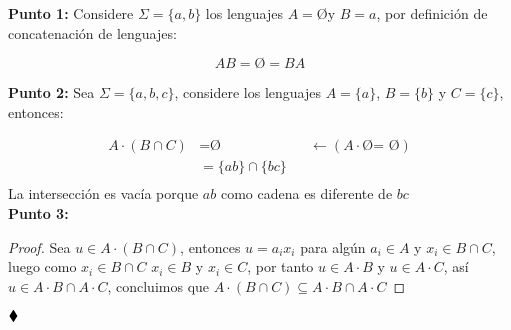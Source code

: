 \textbf{Punto 1:} Considere $\displaystyle\Sigma=\{a,b\}$ los lenguajes $A=$\O \text{ }y $B={a}$, por definición de concatenación de lenguajes:

$$AB=\text{\O}=BA$$

\textbf{Punto 2:} Sea $\displaystyle\Sigma=\{a,b,c\}$, considere los lenguajes $A=\{a\}$, $B=\{b\}$ y $C=\{c\}$, entonces:

\begin{align*}
    A\cdot(B\cap C)&=\text{\O}  &&\longleftarrow(A\cdot \text{\O = \O})\\
    &=\{ab\}\cap\{bc\}\\
\end{align*}
La intersección es vacía porque $ab$ como cadena es diferente de $bc$\\

\textbf{Punto 3:}

\begin{proof}
Sea $u\in A\cdot(B\cap C)$, entonces $u=a_ix_i$ para algún $a_i\in A$ y $x_i \in B\cap C$, luego como $x_i\in B\cap C$ $x_i\in B$ y $x_i \in C$, por tanto $u \in A\cdot B$ y $u\in A\cdot C$, así $u\in A\cdot B \cap A\cdot C$, concluimos que $A \cdot(B \cap C) \subseteq A \cdot B \cap A \cdot C$

\end{proof}


$\hfill \blacklozenge$